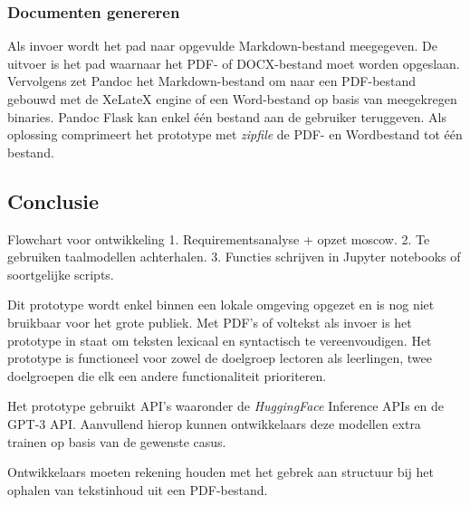 \subsubsection{Documenten genereren}

Als invoer wordt het pad naar opgevulde Markdown-bestand meegegeven. De uitvoer is het pad waarnaar het PDF- of DOCX-bestand moet worden opgeslaan. Vervolgens zet Pandoc het Markdown-bestand om naar een PDF-bestand gebouwd met de XeLateX engine of een Word-bestand op basis van meegekregen binaries. Pandoc Flask kan enkel één bestand aan de gebruiker teruggeven. Als oplossing comprimeert het prototype met \textit{zipfile} de PDF- en Wordbestand tot één bestand. 

\subsection{Conclusie}

Flowchart voor ontwikkeling
1. Requirementsanalyse + opzet moscow.
2. Te gebruiken taalmodellen achterhalen.
3. Functies schrijven in Jupyter notebooks of soortgelijke scripts.

Dit prototype wordt enkel binnen een lokale omgeving opgezet en is nog niet bruikbaar voor het grote publiek. Met PDF's of voltekst als invoer is het prototype in staat om teksten lexicaal en syntactisch te vereenvoudigen. Het prototype is functioneel voor zowel de doelgroep lectoren als leerlingen, twee doelgroepen die elk een andere functionaliteit prioriteren. 

\medspace

Het prototype gebruikt API's waaronder de \textit{HuggingFace} Inference APIs en de GPT-3 API. Aanvullend hierop kunnen ontwikkelaars deze modellen extra trainen op basis van de gewenste casus. 

\medspace

Ontwikkelaars moeten rekening houden met het gebrek aan structuur bij het ophalen van tekstinhoud uit een PDF-bestand.